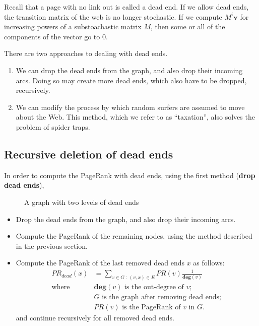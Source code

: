 Recall that a page with no link out is called a dead end. If we allow dead ends, the transition matrix of the web is no longer stochastic. If we compute $M^i \textbf{v}$ for increasing powers of a substoachastic matrix $M$, then some or all of the components of the vector go to $0$.

There are two approaches to dealing with dead ends.

\begin{enumerate}
    \item We can drop the dead ends from the graph, and also drop their incoming arcs. Doing so may create more dead ends, which also have to be dropped, recursively. 
    \item We can modify the process by which random surfers are assumed to move about the Web. This method, which we refer to as ``taxation'', also solves the problem of spider traps. 
\end{enumerate}

\subsection{Recursive deletion of dead ends}\label{subsec:recursive-deletion-dead-ends}

In order to compute the PageRank with dead ends, using the first method (\textbf{drop dead ends}),

\begin{figure}[H]
\centering
\scalebox{1}{
    
}
\caption{A graph with two levels of dead ends}
\label{fig:graph-two-dead-ends}
\end{figure}

\begin{itemize}
    \item Drop the dead ends from the graph, and also drop their incoming arcs.  
    \item Compute the PageRank of the remaining nodes, using the method described in the previous section.
    \item Compute the PageRank of the last removed dead ends $x$ as follows:
        \begin{equation}
            \begin{split}
                PR_{dead}(x) & = \sum_{v \in G \ : \ (v, x) \in E}{PR(v) \frac{1}{\textbf{deg}(v)}} \\
                \text{where } & \textbf{deg}(v) \text{ is the out-degree of } v; \\
                              & G \text{ is the graph after removing dead ends}; \\
                              & PR(v) \text{ is the PageRank of } v \text{ in } G.
            \end{split}
        \end{equation}
        and continue recursively for all removed dead ends.
\end{itemize}


